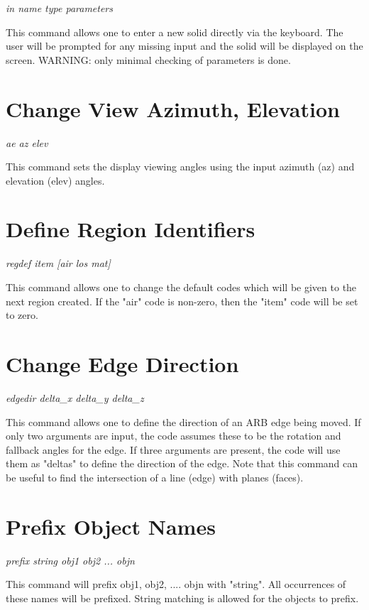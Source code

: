 {\em \center
in name type {parameters}
}

This command allows one to enter a new solid directly via the keyboard.
The user will be prompted for any missing input and the solid will be
displayed on the screen.  WARNING: only minimal checking of parameters
is done.

\section{Change View Azimuth, Elevation}

{\em \center
ae az elev
}

This command sets the display viewing angles using the input azimuth (az)
and elevation (elev) angles.

\section{Define Region Identifiers}

{\em \center
regdef item [air los mat]
}

This command allows one to change the default codes which will be given
to the next region created.
If the "air" code is non-zero, then the "item" code will be set to zero.

\section{Change Edge Direction}

{\em \center
edgedir delta\_x delta\_y delta\_z
}

This command allows one to define the direction of an ARB edge being moved.
If only two arguments are input, the code assumes these to be the
rotation and fallback angles for the edge.
If three arguments are present, the code will use them as "deltas" to
define the direction of the edge.
Note that this command can be useful to find the intersection of
a line (edge) with planes (faces).

\section{Prefix Object Names}

{\em \center
prefix string obj1 obj2 ... objn
}

This command will prefix obj1, obj2, .... objn with "string".  All occurrences
of these names will be prefixed.  String matching is allowed for the objects
to prefix.

